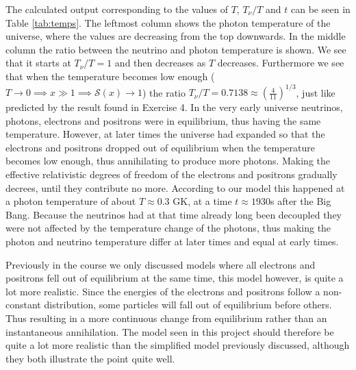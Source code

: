 \documentclass{emulateapj}
\begin{document}
	The calculated output corresponding to the values of $T$, $T_\nu/T$ and $t$ can be seen in Table \ref{tab:temps}.
	The leftmost column shows the photon temperature of the universe, where the values are decreasing from the top downwards. In the middle column the ratio between the neutrino and photon temperature is shown. We see that it starts at $T_\nu/T = 1$ and then decreases as $T$ decreases. Furthermore we see that when the temperature becomes low enough ($T\to0\implies x\gg1\implies\mathcal{S}(x)\to1$) the ratio $T_\nu/T = 0.7138 \approx\left(\frac{4}{11}\right)^{1/3}$, just like predicted by the result found in Exercise 4. In the very early universe neutrinos, photons, electrons and positrons were in equilibrium, thus having the same temperature. However, at later times the universe had expanded so that the electrons and positrons dropped out of equilibrium when the temperature becomes low enough, thus annihilating to produce more photons. Making the effective relativistic degrees of freedom of the electrons and positrons gradually decrees, until they contribute no more. According to our model this happened at a photon temperature of about $T \approx 0.3$ GK, at a time $t\approx1930$s after the Big Bang. Because the neutrinos had at that time already long been decoupled they were not affected by the temperature change of the photons, thus making the photon and neutrino temperature differ at later times and equal at early times. 
	
	Previously in the course we only discussed models where all electrons and positrons fell out of equilibrium at the same time, this model however, is quite a lot more realistic. Since the energies of the electrons and positrons follow a non-constant distribution, some particles will fall out of equilibrium before others. Thus resulting in a more continuous change from equilibrium rather than an instantaneous annihilation. The model seen in this project should therefore be quite a lot more realistic than the simplified model previously discussed, although they both illustrate the point quite well. 
	
	
	

\end{document}
